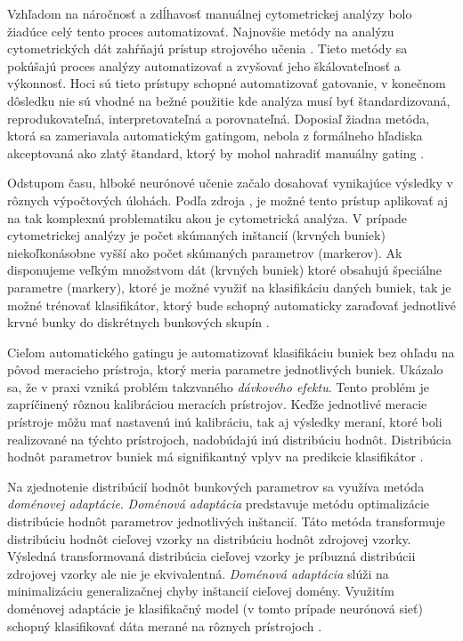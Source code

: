 Vzhľadom na náročnosť a zdĺhavosť manuálnej cytometrickej analýzy bolo žiadúce celý tento proces automatizovať. Najnovšie metódy na analýzu cytometrických dát zahŕňajú prístup strojového učenia \cite{Li2016}. Tieto metódy sa pokúšajú proces analýzy automatizovať a zvyšovať jeho škálovateľnosť a výkonnosť. Hoci sú tieto prístupy schopné automatizovať gatovanie, v konečnom dôsledku nie sú vhodné na bežné použitie kde analýza musí byť štandardizovaná, reprodukovateľná, interpretovateľná a porovnateľná. Doposiaľ žiadna metóda, ktorá sa zameriavala automatickým gatingom, nebola z formálneho hľadiska akceptovaná ako zlatý štandard, ktorý by mohol nahradiť manuálny gating \cite{Li2017}.

Odstupom času, hlboké neurónové učenie začalo dosahovať vynikajúce výsledky v rôznych výpočtových úlohách. Podľa zdroja \cite{Li2016}, je možné tento prístup aplikovať aj na tak komplexnú problematiku akou je cytometrická analýza. V prípade cytometrickej analýzy je počet skúmaných inštancií (krvných buniek) niekoľkonásobne vyšší ako počet skúmaných parametrov (markerov). Ak disponujeme veľkým množstvom dát (krvných buniek) ktoré obsahujú špeciálne parametre (markery), ktoré je možné využiť na klasifikáciu daných buniek, tak je možné trénovať klasifikátor, ktorý bude schopný automaticky zaraďovať jednotlivé krvné bunky do diskrétnych bunkových skupín \cite{Li2016}.

Cieľom automatického gatingu je automatizovať klasifikáciu buniek bez ohľadu na pôvod meracieho prístroja, ktorý meria parametre jednotlivých buniek. Ukázalo sa, že v praxi vzniká problém takzvaného \textit{dávkového efektu}. Tento problém je zapríčinený rôznou kalibráciou meracích prístrojov. Keďže jednotlivé meracie prístroje môžu mať nastavenú inú kalibráciu, tak aj výsledky meraní, ktoré boli realizované na týchto prístrojoch, nadobúdajú inú distribúciu hodnôt. Distribúcia hodnôt parametrov buniek má signifikantný vplyv na predikcie klasifikátor \cite{Li2017}.

Na zjednotenie distribúcií hodnôt bunkových parametrov sa využíva metóda \textit{doménovej adaptácie}. \textit{Doménová adaptácia} predstavuje metódu optimalizácie distribúcie hodnôt parametrov jednotlivých inštancií. Táto metóda transformuje distribúciu hodnôt cieľovej vzorky na distribúciu hodnôt zdrojovej vzorky. Výsledná transformovaná distribúcia cieľovej vzorky je príbuzná distribúcii zdrojovej vzorky ale nie je ekvivalentná. \textit{Doménová adaptácia} slúži na minimalizáciu generalizačnej chyby inštancií cieľovej domény. Využitím doménovej adaptácie je klasifikačný model (v tomto prípade neurónová sieť) schopný klasifikovať dáta merané na rôznych prístrojoch \cite{Li2016, Li2017}.

